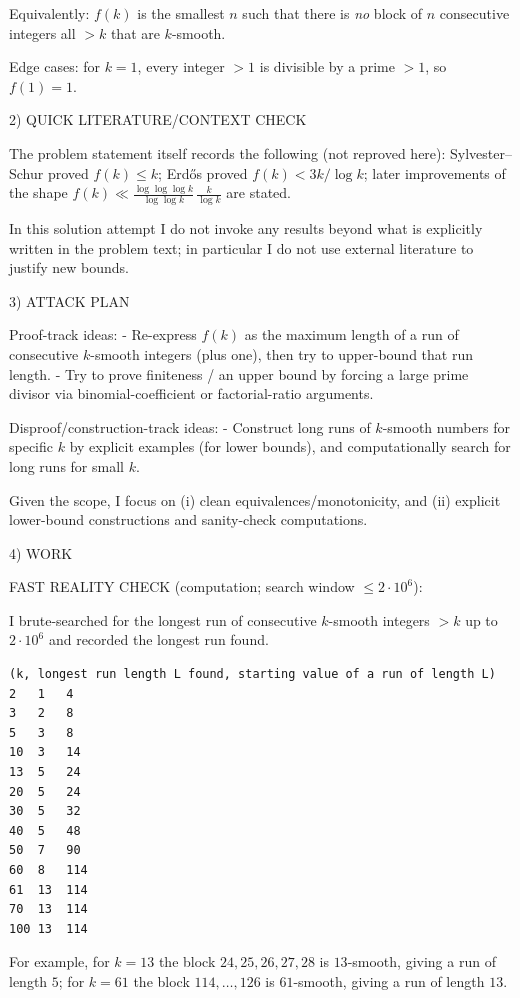 Equivalently: $f(k)$ is the smallest $n$ such that there is \emph{no} block of $n$ consecutive integers all $>k$ that are $k$-smooth.

Edge cases: for $k=1$, every integer $>1$ is divisible by a prime $>1$, so $f(1)=1$.

2) QUICK LITERATURE/CONTEXT CHECK

The problem statement itself records the following (not reproved here): Sylvester--Schur proved $f(k)\le k$; Erd\H{o}s proved $f(k)<3k/\log k$; later improvements of the shape $f(k)\ll \frac{\log\log\log k}{\log\log k}\,\frac{k}{\log k}$ are stated.

In this solution attempt I do not invoke any results beyond what is explicitly written in the problem text; in particular I do not use external literature to justify new bounds.

3) ATTACK PLAN

Proof-track ideas:
- Re-express $f(k)$ as the maximum length of a run of consecutive $k$-smooth integers (plus one), then try to upper-bound that run length.
- Try to prove finiteness / an upper bound by forcing a large prime divisor via binomial-coefficient or factorial-ratio arguments.

Disproof/construction-track ideas:
- Construct long runs of $k$-smooth numbers for specific $k$ by explicit examples (for lower bounds), and computationally search for long runs for small $k$.

Given the scope, I focus on (i) clean equivalences/monotonicity, and (ii) explicit lower-bound constructions and sanity-check computations.

4) WORK

FAST REALITY CHECK (computation; search window $\le 2\cdot 10^6$):

I brute-searched for the longest run of consecutive $k$-smooth integers $>k$ up to $2\cdot 10^6$ and recorded the longest run found.

\begin{verbatim}
(k, longest run length L found, starting value of a run of length L)
2   1   4
3   2   8
5   3   8
10  3   14
13  5   24
20  5   24
30  5   32
40  5   48
50  7   90
60  8   114
61  13  114
70  13  114
100 13  114
\end{verbatim}

For example, for $k=13$ the block $24,25,26,27,28$ is $13$-smooth, giving a run of length $5$; for $k=61$ the block $114,\dots,126$ is $61$-smooth, giving a run of length $13$.

